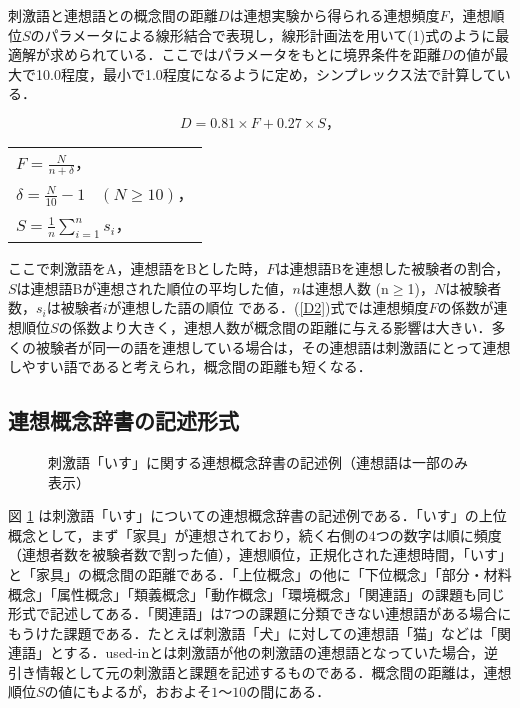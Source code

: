 刺激語と連想語との概念間の距離$D$は連想実験から得られる連想頻度$F$，連想順位$S$のパラメータによる線形結合で表現し，線形計画法を用いて(1)式のように最適解が求められている\cite{Okamoto2001}．ここではパラメータをもとに境界条件を距離$D$の値が最大で10.0程度，最小で1.0程度になるように定め，シンプレックス法で計算している．

\begin{equation}
\label{D2}
D=0.81 \times F + 0.27 \times S ，
\end{equation}

\begin{center}
\begin{tabular}{l}
$F = \frac{N}{n+\delta}$，\\

$\delta = \frac{N}{10} - 1 ~~~~ (N \geq 10)$，\\

$S = \frac{1}{n}\sum^{n}_{i=1} s_{i}$，\\

\end{tabular}
\end{center}


ここで刺激語をA，連想語をBとした時，$F$は連想語Bを連想した被験者の割合，$S$は連想語Bが連想された順位の平均した値，$n$は連想人数 (n$\geq$1)，$N$は被験者数，$s_{i}$は被験者$i$が連想した語の順位
である．(\ref{D2})式では連想頻度$F$の係数が連想順位$S$の係数より大きく，連想人数が概念間の距離に与える影響は大きい．多くの被験者が同一の語を連想している場合は，その連想語は刺激語にとって連想しやすい語であると考えられ，概念間の距離も短くなる．


\subsection{連想概念辞書の記述形式}

\begin{figure}[htb]
	\begin{center}
		\caption{刺激語「いす」に関する連想概念辞書の記述例（連想語は一部のみ表示）}
		\label{isu}
	\end{center}
\end{figure}

図 \ref{isu} は刺激語「いす」についての連想概念辞書の記述例である．「いす」の上位概念として，まず「家具」が連想されており，続く右側の4つの数字は順に頻度（連想者数を被験者数で割った値），連想順位，正規化された連想時間，「いす」と「家具」の概念間の距離である．「上位概念」の他に「下位概念」「部分・材料概念」「属性概念」「類義概念」「動作概念」「環境概念」「関連語」の課題も同じ形式で記述してある．「関連語」は7つの課題に分類できない連想語がある場合にもうけた課題である．たとえば刺激語「犬」に対しての連想語「猫」などは「関連語」とする．used-inとは刺激語が他の刺激語の連想語となっていた場合，逆引き情報として元の刺激語と課題を記述するものである．概念間の距離は，連想順位$S$の値にもよるが，おおよそ$1$〜$10$の間にある\cite{Okamoto2001}．



